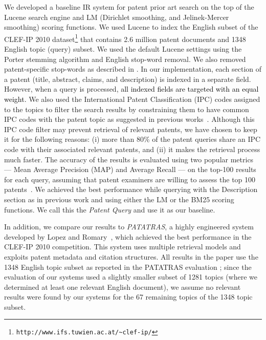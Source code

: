 We developed a baseline IR system for patent prior art search on the top of
the Lucene search engine
and LM (Dirichlet
smoothing, and Jelinek-Mercer smoothing)
scoring functions. %
We used Lucene to index the English subset of the CLEF-IP 2010 dataset\footnote{\texttt{http://www.ifs.tuwien.ac.at/\textasciitilde{}clef-ip/}} 
that contains 2.6 million patent documents and 1348 English topic (query) subset.
We used the default Lucene settings using the Porter stemming algorithm 
and English stop-word removal. 
We also removed patent-specific stop-words as described in \cite{magdy2012toward}.
In
our implementation, each section of a patent (title, abstract, claims,
and description) is indexed in a separate field. However, when a query 
is processed, \textcolor{black}{all indexed fields are targeted with an equal weight.}
We also used the International
Patent Classification (IPC) codes assigned to the topics to filter
the search results by constraining them to have common IPC codes with
the patent topic as suggested in previous works~\cite{lopez2010experiments}.
Although this IPC code filter may prevent retrieval of relevant patents, we
have chosen to keep it for the following reasons: (i) more than 80\%
of the patent queries share an IPC code with their associated relevant
patents, and (ii) it makes the retrieval process much faster. The accuracy of the results is evaluated using two popular metrics --- Mean Average Precision (MAP) and Average Recall --- on the top-100 results for each query, assuming that patent examiners are willing to assess the top 100 patents~\cite{joho2010survey}. 
We achieved the best performance while querying with the Description
section as in previous work \cite{xue2009transforming} and using
either the LM or the BM25 scoring functions. We call this 
the \textit{Patent Query} and use it as our baseline.

In addition, we compare our results to \textit{PATATRAS}, a highly engineered system developed by Lopez and Romary~\cite{lopez2010experiments}, 
which achieved the best performance in the CLEF-IP 2010 competition. This system uses multiple retrieval models %
and exploits patent metadata and citation structures.  All results in the paper use the 1348 English topic subset as reported in the PATATRAS evaluation \cite{piroi2010clef}; since the evaluation of our systems used a slightly smaller subset of 1281 topics (where we determined at least one relevant English document), we assume no relevant results were found by our systems for the 67 remaining topics of the 1348 topic subset.

